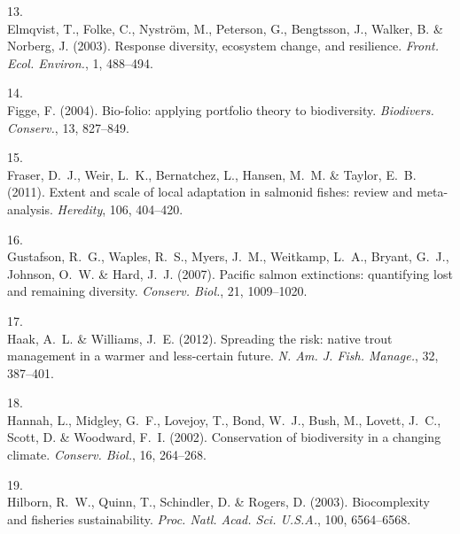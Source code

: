 \documentclass[11pt]{article}
\begin{document}
\begin{spacing}{1.6}
\begin{thebibliography}{50}
13.\\
Elmqvist, T., Folke, C., Nystr{\"o}m, M., Peterson, G., Bengtsson, J., Walker,
  B. \& Norberg, J. (2003).
\newblock Response diversity, ecosystem change, and resilience.
\newblock \emph{Front. Ecol. Environ.}, 1, 488--494.

14.\\
Figge, F. (2004).
\newblock Bio-folio: applying portfolio theory to biodiversity.
\newblock \emph{Biodivers. Conserv.}, 13, 827--849.

15.\\
Fraser, D.~J., Weir, L.~K., Bernatchez, L., Hansen, M.~M. \& Taylor, E.~B.
  (2011).
\newblock Extent and scale of local adaptation in salmonid fishes: review and
  meta-analysis.
\newblock \emph{Heredity}, 106, 404--420.

16.\\
Gustafson, R.~G., Waples, R.~S., Myers, J.~M., Weitkamp, L.~A., Bryant, G.~J.,
  Johnson, O.~W. \& Hard, J.~J. (2007).
\newblock Pacific salmon extinctions: quantifying lost and remaining diversity.
\newblock \emph{Conserv. Biol.}, 21, 1009--1020.

17.\\
Haak, A.~L. \& Williams, J.~E. (2012).
\newblock Spreading the risk: native trout management in a warmer and
  less-certain future.
\newblock \emph{N. Am. J. Fish. Manage.}, 32, 387--401.

18.\\
Hannah, L., Midgley, G.~F., Lovejoy, T., Bond, W.~J., Bush, M., Lovett, J.~C.,
  Scott, D. \& Woodward, F.~I. (2002).
\newblock Conservation of biodiversity in a changing climate.
\newblock \emph{Conserv. Biol.}, 16, 264--268.

19.\\
Hilborn, R.~W., Quinn, T., Schindler, D. \& Rogers, D. (2003).
\newblock Biocomplexity and fisheries sustainability.
\newblock \emph{Proc. Natl. Acad. Sci. U.S.A.}, 100, 6564--6568.


\end{thebibliography}
\end{spacing}
\end{document}
